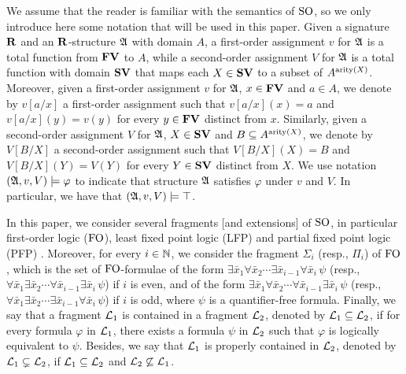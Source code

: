 We assume that the reader is familiar with the semantics of ${\rm SO}$, so we only introduce here some notation that will be used in this paper. 
Given a signature $\mathbf{R}$ and an $\mathbf{R}$-structure $\mathfrak{A}$ with domain $A$, a first-order assignment $v$ for $\mathfrak{A}$ is a total function from $\mathbf{FV}$ to $A$, while a second-order assignment $V$ for $\mathfrak{A}$ is a total function with domain $\mathbf{SV}$ that maps each $X \in \mathbf{SV}$ to a subset of $A^{{\rm arity}(X)}$. Moreover, given a first-order assignment $v$ for $\mathfrak{A}$, $x \in \mathbf{FV}$ and $a \in A$, we denote by $v[a/x]$ a first-order assignment such that $v[a/x](x) = a$ and $v[a/x](y) = v(y)$ for every $y \in \mathbf{FV}$ distinct from $x$. Similarly, given a second-order assignment $V$ for $\mathfrak{A}$, $X \in \mathbf{SV}$ and $B  \subseteq A^{{\rm arity}(X)}$, we denote by $V[B/X]$ a second-order assignment such that $V[B/X](X) = B$ and $V[B/X](Y) = V(Y)$ for every $Y \in \mathbf{SV}$ distinct from $X$. We use notation $(\mathfrak{A}, v, V) \models \varphi$ to indicate that structure $\mathfrak{A}$ satisfies $\varphi$ under $v$ and $V$. In particular, we have that $(\mathfrak{A}, v, V) \models \top$.

In this paper, we consider several fragments [and extensions] of ${\rm SO}$, in particular first-order logic (${\rm FO}$), least fixed point logic (LFP) and partial fixed point logic (PFP) \cite{L04}. Moreover, for every $i \in \mathbb{N}$, we consider the fragment $\Sigma_i$ (resp., $\Pi_i$) of ${\rm FO}$, which is the set of ${\rm FO}$-formulae of the form 
$\exists \bar x_1 \forall \bar x_2 \cdots \exists \bar x_{i-1} \forall \bar x_{i} \, \psi$ (resp., 
$\forall \bar x_1 \exists \bar x_2 \cdots \forall \bar x_{i-1} \exists \bar x_{i} \, \psi$) if $i$ is even, and of the form
$\exists \bar x_1 \forall \bar x_2 \cdots \forall \bar x_{i-1} \exists \bar x_{i} \, \psi$ (resp., 
$\forall \bar x_1 \exists \bar x_2 \cdots \exists \bar x_{i-1} \forall \bar x_{i} \, \psi$) if $i$ is odd, where $\psi$ is a quantifier-free formula. Finally, we say that a fragment $\mathcal{L}_1$ is contained in a fragment $\mathcal{L}_2$, denoted by $\mathcal{L}_1 \subseteq \mathcal{L}_2$, if for every formula $\varphi$ in $\mathcal{L}_1$, there exists a formula $\psi$ in $\mathcal{L}_2$ such that $\varphi$ is logically equivalent to $\psi$.  Besides, we say that $\mathcal{L}_1$ is properly contained in $\mathcal{L}_2$, denoted by $\mathcal{L}_1 \subsetneq \mathcal{L}_2$, if $\mathcal{L}_1 \subseteq \mathcal{L}_2$ and $\mathcal{L}_2 \not\subseteq \mathcal{L}_1$.


